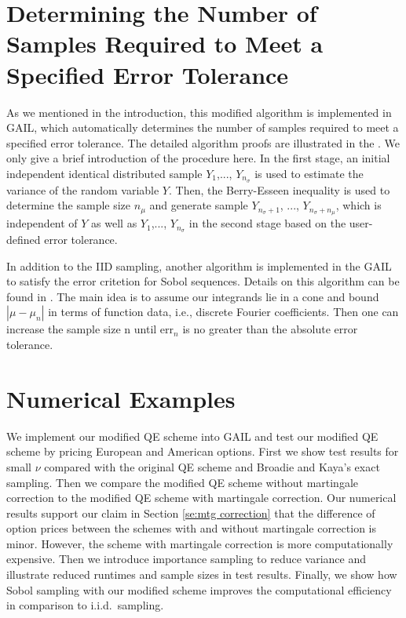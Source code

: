 \documentclass{ws-ijfe}
\begin{document}
\section{Determining the Number of Samples Required to Meet a Specified Error Tolerance}
As we mentioned in the introduction, this modified algorithm is implemented in GAIL, which automatically determines the number of samples required to meet a specified error tolerance. The detailed algorithm proofs are illustrated in the \cite{HickernellandLan2013}. We only give a brief introduction of the procedure here. In the first stage, an initial independent identical distributed sample $Y_1$,..., $Y_{n_\sigma}$ is used to estimate the variance of the random variable $Y$. Then, the Berry-Esseen inequality is used to determine the sample size $n_\mu$ and generate sample $Y_{n_\sigma+1}$, ..., $Y_{n_\sigma+n_\mu}$, which is independent of $Y$ as well as $Y_1$,..., $Y_{n_\sigma}$ in the second stage based on the user-defined error tolerance.

In addition to the IID sampling, another algorithm is implemented in the GAIL to satisfy the error critetion for Sobol sequences. Details on this algorithm can be found in \cite{HickernellTonyandDa}. The main idea is to assume our integrands lie in a cone and bound $|\mu-\mu_n|$ in terms of function data, i.e., discrete Fourier coefficients. Then one can increase the sample size n until $\text{err}_n$ is no greater than the absolute error tolerance.


\section{Numerical Examples}

We implement our modified QE scheme into GAIL and test our modified QE scheme by pricing European and American options. First we show test results for small $\nu$ compared with the original QE scheme and Broadie and Kaya's exact sampling. Then we compare the modified QE scheme without martingale correction to the modified QE scheme with martingale correction. Our numerical results support our claim in Section \ref{se:mtg correction} that the difference of option prices between the schemes with and without martingale correction is minor. However, the scheme with martingale correction is more computationally expensive. Then we introduce importance sampling to reduce variance and illustrate reduced runtimes and sample sizes in test results. Finally, we show how Sobol sampling with our modified scheme improves the computational efficiency in comparison to i.i.d.\ sampling.
\end{document}
